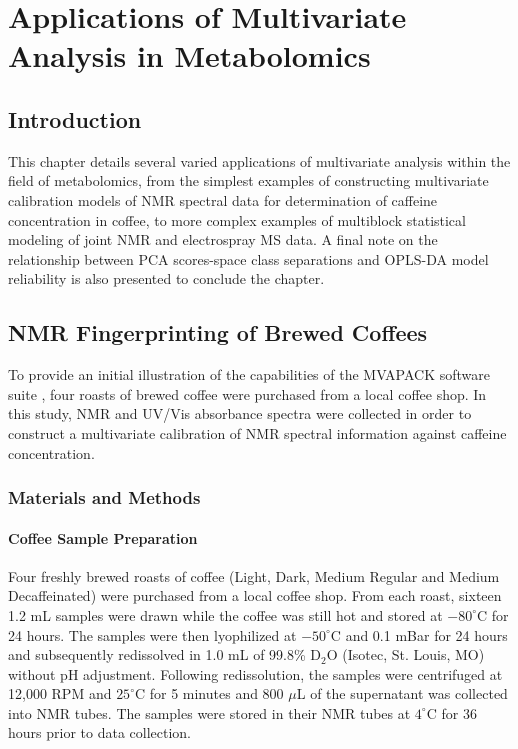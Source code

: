 
\chapter{Applications of Multivariate Analysis in Metabolomics}

\section{Introduction}

\begin{doublespace}
This chapter details several varied applications of multivariate analysis
within the field of metabolomics, from the simplest examples of constructing
multivariate calibration models of \hnmr{} NMR spectral data for determination
of caffeine concentration in coffee, to more complex examples of multiblock
statistical modeling of joint \hnmr{} NMR and electrospray MS data. A final
note on the relationship between PCA scores-space class separations and OPLS-DA
model reliability is also presented to conclude the chapter.
\end{doublespace}

\section{\hnmr{} NMR Fingerprinting of Brewed Coffees}

\begin{doublespace}
To provide an initial illustration of the capabilities of the MVAPACK software
suite \cite{worley:acscb2014}, four roasts of brewed coffee were purchased from
a local coffee shop. In this study, \hnmr{} NMR and UV/Vis absorbance spectra
were collected in order to construct a multivariate calibration of \hnmr{} NMR
spectral information against caffeine concentration.
\end{doublespace}

\subsection{Materials and Methods}

\subsubsection{Coffee Sample Preparation}

\begin{doublespace}
Four freshly brewed roasts of coffee (Light, Dark, Medium Regular and Medium
Decaffeinated) were purchased from a local coffee shop. From each roast,
sixteen 1.2 mL samples were drawn while the coffee was still hot and stored
at $-80^\circ$C for 24 hours. The samples were then lyophilized at
$-50^\circ$C and 0.1 mBar for 24 hours and subsequently redissolved in 1.0 mL
of 99.8\% D$_2$O (Isotec, St. Louis, MO) without pH adjustment. Following
redissolution, the samples were centrifuged at 12,000 RPM and $25^\circ$C
for 5 minutes and 800 $\mu$L of the supernatant was collected into NMR tubes.
The samples were stored in their NMR tubes at $4^\circ$C for 36 hours prior
to data collection.
\end{doublespace}

